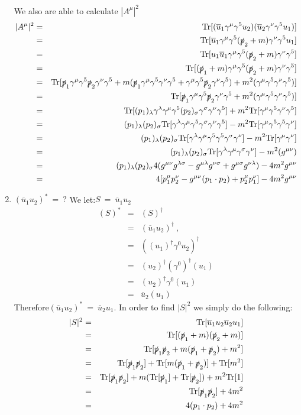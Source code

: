 \documentclass[12pt]{article}
\def \bea{\begin{eqnarray}}
\def \eea{\end{eqnarray}}
\def \Tr{{\rm Tr}}
\def \ou{\overline{u}}
\def \ga{\gamma}
\def \la{\lambda}
\def \si{\sigma}
\begin{document}
\begin{enumerate}
We also are able to calculate $|A^\mu|^2$
\bea
|A^{\mu}|^2 &=& \Tr[(\ou_1\ga^\mu \ga^5 u_2)(\ou_2 \ga^\nu \ga^5 u_1)] \\
&=& \Tr[\ou_1\ga^\mu \ga^5 (\slashed{p}_2+m) \ga^\nu \ga^5 u_1]  \\
&=&\Tr[u_1\ou_1\ga^\mu \ga^5 (\slashed{p}_2+m) \ga^\nu \ga^5 ]\\
&=&\Tr[(\slashed{p}_1+m)\ga^\mu \ga^5 (\slashed{p}_2+m) \ga^\nu \ga^5 ]\\
&=& \Tr[\slashed{p}_1\ga^\mu\ga^5 \slashed{p}_2\ga^\nu \ga^5 + m( \slashed{p}_1\ga^\mu\ga^5\ga^\nu \ga^5 +\ga^\mu\ga^5 \slashed{p}_2\ga^\nu \ga^5) + m^2(\ga^\mu\ga^5\ga^\nu \ga^5)] \\
&=&\Tr[\slashed{p}_1\ga^\mu\ga^5 \slashed{p}_2\ga^\nu \ga^5 + m^2(\ga^\mu\ga^5\ga^\nu \ga^5)] \\
&=& \Tr[(p_1)_\la\ga^\la\ga^\mu\ga^5 (p_2)_\si\ga^\si\ga^\nu \ga^5] + m^2\Tr[\ga^\mu\ga^5\ga^\nu \ga^5]\\
&=& (p_1)_\la(p_2)_\si \Tr[\ga^\la\ga^\mu\ga^5 \ga^\si\ga^\nu \ga^5] - m^2\Tr[\ga^\mu\ga^5\ga^5 \ga^\nu]\\
&=& (p_1)_\la(p_2)_\si \Tr[\ga^\la\ga^\mu\ga^5\ga^5 \ga^\si\ga^\nu] - m^2\Tr[\ga^\mu\ga^\nu]\\
&=& (p_1)_\la(p_2)_\si \Tr[\ga^\la\ga^\mu\ga^\si\ga^\nu] - m^2(g^{\mu\nu})\\
&=& (p_1)_\la(p_2)_\si 4(g^{\mu\nu}g^{\la\si} - g^{\mu\la} g^{\nu\si} + g^{\mu\si}g^{\nu\la}) - 4m^2g^{\mu\nu}\\
&=& 4[p_1^\mu p_2^\nu - g^{\mu\nu}(p_1 \cdot p_2) + p_2^\mu p_1^\nu] - 4m^2g^{\mu\nu} 
\eea

\item $ (\ou_1 u_2)^* ~=~ ?$
We let:$S ~=~ \ou_1 u_2$
\bea
(S)^* &=& (S)^\dag \\
&=& (\ou_1 u_2)^\dag ~,~~ \\
&=& ((u_1)^\dag\ga^0 u_2)^\dag \\
&=& (u_2)^\dag(\ga^0)^\dag(u_1)\\
&=& (u_2)^\dag\ga^0(u_1)\\
&=& \ou_2(u_1)
\eea
Therefore$(\ou_1 u_2)^* ~=~ \ou_2 u_1$.
In order to find $|S|^2$ we simply do the following:
\bea
|S|^2&=& \Tr[\ou_1 u_2 \ou_2 u_1]  \\
&=& \Tr[(\slashed{p}_1+m)(\slashed{p}_2+m)] \\
&=& \Tr[\slashed{p}_1\slashed{p}_2+m(\slashed{p}_1+\slashed{p}_2)+m^2]\\
&=& \Tr[\slashed{p}_1\slashed{p}_2]+\Tr[m(\slashed{p}_1+\slashed{p}_2)]+\Tr[m^2] \\
&=& \Tr[\slashed{p}_1\slashed{p}_2]+m(\Tr[\slashed{p}_1]+\Tr[\slashed{p}_2])+m^2\Tr[1] \\
&=& \Tr[\slashed{p}_1\slashed{p}_2]+4m^2 \\
&=& 4(p_1 \cdot p_2)+4m^2
\eea


\end{enumerate}
\end{document}
